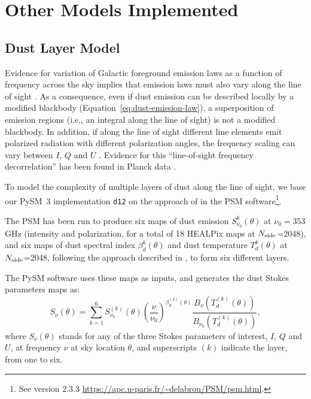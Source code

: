 \documentclass[twocolumn]{aastex631}
\begin{document}
\section{Other Models Implemented} \label{sec:other_models}

\subsection{Dust Layer Model} \label{sec:layers}
Evidence for variation of Galactic foreground emission laws as a function of frequency across the sky implies that emission laws must also vary along the line of sight \citep{Martinez-Solaeche:2018}. As a consequence, even if dust emission can be described locally by a modified blackbody (Equation~\ref{eq:dust-emission-law}), a superposition of emission regions (i.e., an integral along the line of sight) is not a modified blackbody. In addition, if along the line of sight different line elements emit polarized radiation with different polarization angles, the frequency scaling can vary between $I$, $Q$ and $U$ \citep{Tassis:2015}. Evidence for this ``line-of-sight frequency decorrelation'' has been found in Planck data \citep{Pelgrims:2021}.

To model the complexity of multiple layers of dust along the line of sight, we base our  PySM~3 implementation \texttt{d12} on the approach of \cite{Martinez-Solaeche:2018} in the PSM software\footnote{See version 2.3.3 \url{https://apc.u-paris.fr/~delabrou/PSM/psm.html}.}. 

The PSM has been run to produce six maps of dust emission $S_{\nu_0}^k(\theta)$ at $\nu_0 = 353$ GHz (intensity and polarization, for a total of 18 HEALPix maps at $N_{\rm side}$=2048), and six maps of dust spectral index $\beta_d^k(\theta)$ and dust temperature $T_d^k(\theta)$ at $N_{\rm side}$=2048, following the approach described in \cite{Martinez-Solaeche:2018}, to form six different layers.

The PySM software uses these maps as inputs, and generates the dust Stokes parameters maps as:
\begin{equation}
    S_\nu(\theta) = \sum_{k=1}^6 S^{(k)}_{\nu_0}(\theta)
    \left( \frac{\nu}{\nu_0} \right)^{\beta^{(k)}_d(\theta)}
    \frac{B_\nu(T^{(k)}_d(\theta))}{B_{\nu_0}(T^{(k)}_d(\theta))},
\end{equation}
where $S_\nu(\theta)$ stands for any of the three Stokes parameters of interest, $I$, $Q$ and $U$, at frequency $\nu$ at sky location $\theta$, and superscripts ${(k)}$ indicate the layer, from one to six.
\end{document}
